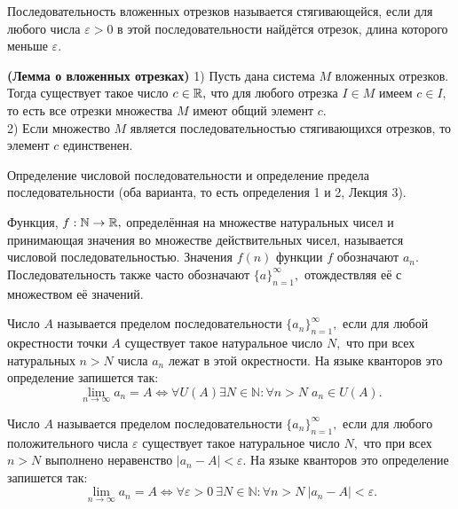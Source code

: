 \begin{definition}
	Последовательность вложенных отрезков называется
	стягивающейся, если для любого
	числа $\varepsilon>0$ в этой последовательности
	найдётся отрезок, длина которого меньше $\varepsilon.$
\end{definition}

\begin{theorem} \textbf{\textrm{(Лемма о вложенных отрезках)}}
	1) Пусть дана система $M$ вложенных отрезков. Тогда
	существует такое число $c\in\mathbb{R},$ что для любого отрезка
	$I\in M$ имеем $c\in I,$ то есть все отрезки
	множества $M$ имеют общий элемент $c$.\\
	2) Если множество $M$
	является последовательностью стягивающихся отрезков,
	то элемент $c$ единственен.
\end{theorem}


\newpage
\begin{problem}
Определение числовой последовательности и определение предела последовательности
(оба варианта, то есть определения 1 и 2, Лекция 3).
\end{problem}

\begin{definition}
	Функция, $f:\mathbb{N}\rightarrow\mathbb{R},$
	определённая на множестве натуральных
	чисел и принимающая значения во множестве
	действительных чисел, называется числовой
	последовательностью.
	Значения $f(n)$ функции $f$ обозначают $a_n.$
	Последовательность также часто обозначают
	$\{a\}_{n=1}^{\infty},$ отождествляя её с
	множеством её значений.
\end{definition}
\begin{definition}
	Число $A$ называется пределом
	последовательности $\{a_n\}_{n=1}^{\infty},$
	если для любой окрестности точки $A$
	существует такое натуральное число $N,$
	что при всех натуральных $n>N$ числа $a_n$ лежат в этой
	окрестности. На языке кванторов это определение
	запишется так:
	$$
		\lim\limits_{n\rightarrow\infty}a_n=A\Leftrightarrow
		\forall U(A)\exists N\in\mathbb{N}: \forall n>N\; a_n\in U(A).
	$$
\end{definition}

\begin{definition}
	Число $A$ называется пределом
	последовательности $\{a_n\}_{n=1}^{\infty},$
	если для любого положительного числа $\varepsilon$
	существует такое натуральное число $N,$
	что при всех $n>N$ выполнено неравенство
	$|a_n-A|<\varepsilon.$
	На языке кванторов это определение
	запишется так:
	$$
		\lim\limits_{n\rightarrow\infty}a_n=A\Leftrightarrow
		\forall \varepsilon>0 \ \exists N\in\mathbb{N}:
		\forall n>N \ |a_n-A|<\varepsilon.
	$$
\end{definition}

